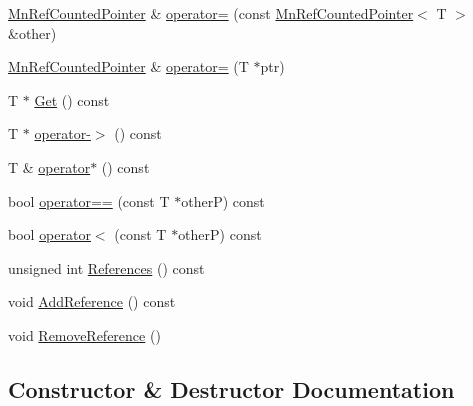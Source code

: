 \begin{DoxyCompactItemize}
\item 
\mbox{\hyperlink{classROOT_1_1Minuit2_1_1MnRefCountedPointer}{Mn\+Ref\+Counted\+Pointer}} \& \mbox{\hyperlink{classROOT_1_1Minuit2_1_1MnRefCountedPointer_a6a7380791625cf84a89a3b4fa32b7029}{operator=}} (const \mbox{\hyperlink{classROOT_1_1Minuit2_1_1MnRefCountedPointer}{Mn\+Ref\+Counted\+Pointer}}$<$ T $>$ \&other)
\item 
\mbox{\hyperlink{classROOT_1_1Minuit2_1_1MnRefCountedPointer}{Mn\+Ref\+Counted\+Pointer}} \& \mbox{\hyperlink{classROOT_1_1Minuit2_1_1MnRefCountedPointer_a6867125c7f9d76199e7a6676eed5f682}{operator=}} (T $\ast$ptr)
\item 
T $\ast$ \mbox{\hyperlink{classROOT_1_1Minuit2_1_1MnRefCountedPointer_ae88bd272c286587bad6200c41c66909b}{Get}} () const
\item 
T $\ast$ \mbox{\hyperlink{classROOT_1_1Minuit2_1_1MnRefCountedPointer_a9fa09cb52e1c503eb82c3359932eef34}{operator-\/$>$}} () const
\item 
T \& \mbox{\hyperlink{classROOT_1_1Minuit2_1_1MnRefCountedPointer_ab926bb95d092c87afef79bb6c1776bd4}{operator$\ast$}} () const
\item 
bool \mbox{\hyperlink{classROOT_1_1Minuit2_1_1MnRefCountedPointer_a2dbec0c22ef3492abc24cdaa885fd26e}{operator==}} (const T $\ast$otherP) const
\item 
bool \mbox{\hyperlink{classROOT_1_1Minuit2_1_1MnRefCountedPointer_a5927f1f650da34bb024a31e18119ed1e}{operator$<$}} (const T $\ast$otherP) const
\item 
unsigned int \mbox{\hyperlink{classROOT_1_1Minuit2_1_1MnRefCountedPointer_acffac58848d817d7747631954daf3e0c}{References}} () const
\item 
void \mbox{\hyperlink{classROOT_1_1Minuit2_1_1MnRefCountedPointer_a9a8d01a9009e9a9b272c14e46cbeb4d5}{Add\+Reference}} () const
\item 
void \mbox{\hyperlink{classROOT_1_1Minuit2_1_1MnRefCountedPointer_a8e348ffb51b9ed7793cce28e6330309f}{Remove\+Reference}} ()
\end{DoxyCompactItemize}


\subsection{Constructor \& Destructor Documentation}
\mbox{\label{classROOT_1_1Minuit2_1_1MnRefCountedPointer_ab597b297b8bc186cf67a2c6874c2d169}} 
